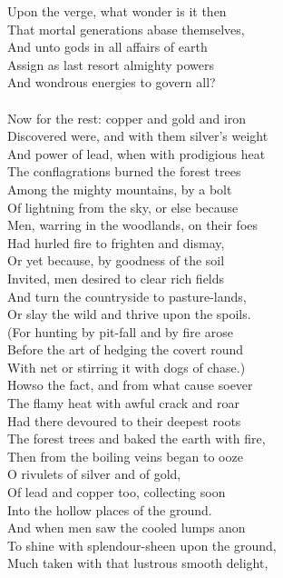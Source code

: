 Upon the verge, what wonder is it then\\
That mortal generations abase themselves,\\
And unto gods in all affairs of earth\\
Assign as last resort almighty powers\\
And wondrous energies to govern all?\\
\\
Now for the rest: copper and gold and iron\\
Discovered were, and with them silver's weight\\
And power of lead, when with prodigious heat\\
The conflagrations burned the forest trees\\
Among the mighty mountains, by a bolt\\
Of lightning from the sky, or else because\\
Men, warring in the woodlands, on their foes\\
Had hurled fire to frighten and dismay,\\
Or yet because, by goodness of the soil\\
Invited, men desired to clear rich fields\\
And turn the countryside to pasture-lands,\\
Or slay the wild and thrive upon the spoils.\\
(For hunting by pit-fall and by fire arose\\
Before the art of hedging the covert round\\
With net or stirring it with dogs of chase.)\\
Howso the fact, and from what cause soever\\
The flamy heat with awful crack and roar\\
Had there devoured to their deepest roots\\
The forest trees and baked the earth with fire,\\
Then from the boiling veins began to ooze\\
O rivulets of silver and of gold,\\
Of lead and copper too, collecting soon\\
Into the hollow places of the ground.\\
And when men saw the cooled lumps anon\\
To shine with splendour-sheen upon the ground,\\
Much taken with that lustrous smooth delight,\\
